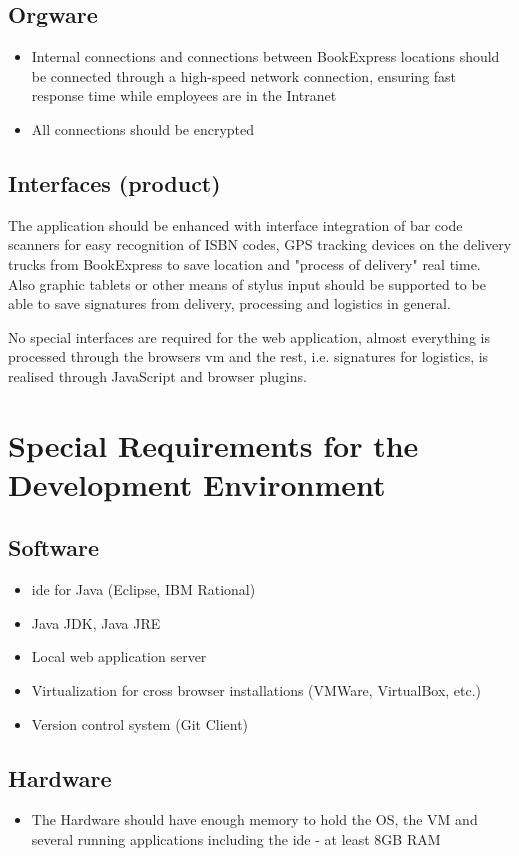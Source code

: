\documentclass[11pt,a4paper,oneside,svgnames]{report}
\begin{document}
\section{Orgware}
\begin{itemize}
	\item Internal connections and connections between BookExpress locations should be connected through a high-speed network connection, ensuring fast response time while employees are in the Intranet
	\item All connections should be encrypted
\end{itemize}

\section{Interfaces (product)}
\label{sec:tpe-interfaces}
The application should be enhanced with interface integration of bar code scanners for easy recognition of ISBN codes, GPS tracking devices on the delivery trucks from BookExpress to save location and "process of delivery" real time. Also graphic tablets or other means of stylus input should be supported to be able to save signatures from delivery, processing and logistics in general.

No special interfaces are required for the web application, almost everything is processed through the browsers \gls{vm} and the rest, i.e. signatures for logistics, is realised through JavaScript and browser plugins.

\chapter{Special Requirements for the Development Environment}
\section{Software}
	\begin{itemize}
		\item \gls{ide} for Java (Eclipse, IBM Rational)
		\item Java JDK, Java JRE
		\item Local web application server
		\item Virtualization for cross browser installations (VMWare, VirtualBox, etc.)
		\item Version control system (Git Client)
	\end{itemize}
\section{Hardware}
	\begin{itemize}
		\item The Hardware should have enough memory to hold the OS, the VM and several running applications including the \gls{ide} - at least 8GB RAM
	\end{itemize}
\end{document}
